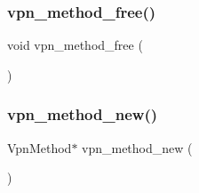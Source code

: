\subsubsection{\texorpdfstring{vpn\+\_\+method\+\_\+free()}{vpn\_method\_free()}}
{\footnotesize\ttfamily void vpn\+\_\+method\+\_\+free (\begin{DoxyParamCaption}{ }\end{DoxyParamCaption})}

\mbox{\label{route-tree_8c_a3ccbf1b413fe282c1490701f739273a8}} 
\subsubsection{\texorpdfstring{vpn\+\_\+method\+\_\+new()}{vpn\_method\_new()}}
{\footnotesize\ttfamily Vpn\+Method$\ast$ vpn\+\_\+method\+\_\+new (\begin{DoxyParamCaption}{ }\end{DoxyParamCaption})}

